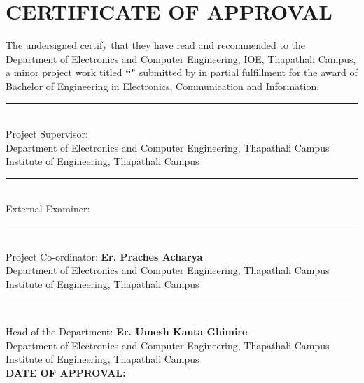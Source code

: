 \newpage
\section*{CERTIFICATE OF APPROVAL}
The undersigned certify that they have read and recommended to the Department of Electronics and Computer Engineering, IOE, Thapathali Campus, a minor project work titled \textbf{``\titlename"} submitted by \textbf{\authornames} in partial fulfillment for the award of Bachelor of Engineering in Electronics, Communication and Information.
\vspace{2\baselineskip}

    \rule{0.5\linewidth}{0.4pt}\\
    Project Supervisor: \textbf{\supervisorname}\\
    Department of Electronics and Computer Engineering, Thapathali Campus\\
    Institute of Engineering, Thapathali Campus\\

    \rule{0.5\linewidth}{0.4pt} \\
    External Examiner: \\

    \rule{0.5\linewidth}{0.4pt} \\
    Project Co-ordinator: \textbf{Er. Praches Acharya}\\
    Department of Electronics and Computer Engineering, Thapathali Campus\\
    Institute of Engineering, Thapathali Campus\\
    
    \rule{0.5\linewidth}{0.4pt} \\
    Head of the Department: \textbf{Er. Umesh Kanta Ghimire}\\ 
    Department of Electronics and Computer Engineering, Thapathali Campus\\
    Institute of Engineering, Thapathali Campus\\

\vspace{2\baselineskip}
\textbf{DATE OF APPROVAL:}
